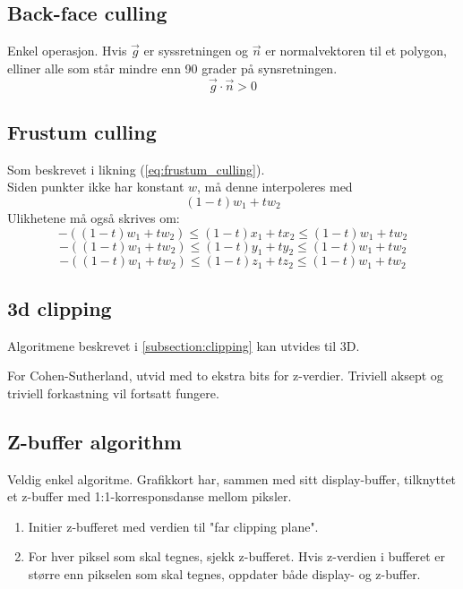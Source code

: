 \subsection{Back-face culling}
Enkel operasjon. Hvis $\vec{g}$ er syssretningen og $\vec{n}$ er normalvektoren til et polygon, elliner alle som står mindre enn 90 grader på synsretningen.
\begin{equation}
    \vec{g} \cdot \vec{n} > 0
\end{equation}

\subsection{Frustum culling}
Som beskrevet i likning (\ref{eq:frustum_culling}). \\
Siden punkter ikke har konstant $w$, må denne interpoleres med
\begin{equation}
    (1-t) w_1 + t w_2
\end{equation}
Ulikhetene må også skrives om:
\begin{equation}
    -((1-t)w_1 + t w_2) \le (1-t)x_1 + t x_2 \le (1-t)w_1 + t w_2
\end{equation}
\begin{equation}
    -((1-t)w_1 + t w_2) \le (1-t)y_1 + t y_2 \le (1-t)w_1 + t w_2
\end{equation}
\begin{equation}
    -((1-t)w_1 + t w_2) \le (1-t)z_1 + t z_2 \le (1-t)w_1 + t w_2
\end{equation}

\subsection{3d clipping}
Algoritmene beskrevet i \ref{subsection:clipping} kan utvides til 3D.

For Cohen-Sutherland, utvid med to ekstra bits for z-verdier. Triviell aksept og triviell forkastning vil fortsatt fungere.

\subsection{Z-buffer algorithm}
Veldig enkel algoritme. Grafikkort har, sammen med sitt display-buffer, tilknyttet et z-buffer med 1:1-korresponsdanse mellom piksler.
\begin{enumerate}
    \item Initier z-bufferet med verdien til "far clipping plane".
    \item For hver piksel som skal tegnes, sjekk z-bufferet. Hvis z-verdien i bufferet er større enn pikselen som skal tegnes, oppdater både display- og z-buffer.
\end{enumerate}

